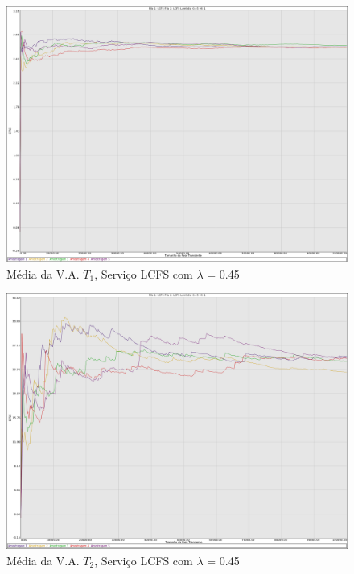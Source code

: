 \documentclass[a4paper,10pt]{article}
\begin{document}
\begin{figure}
	\caption{Média da V.A. $T_1$, Serviço LCFS com $\lambda$ = 0.45}
	\label{figTransienteLCFSfila1T}
	\includegraphics[scale = 0.20]{./graficos_transiente_1/LCFS/05.png}
\end{figure}

\begin{figure}
	\caption{Média da V.A. $T_2$, Serviço LCFS com $\lambda$ = 0.45}
	\label{figTransienteLCFSfila2T}
	\includegraphics[scale = 0.20]{./graficos_transiente_1/LCFS/06.png}
\end{figure}
\end{document}

